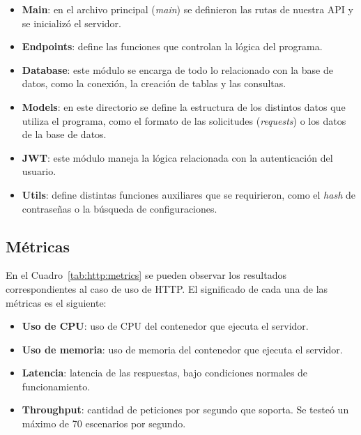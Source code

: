 \documentclass[11pt]{article}
\let\Oldsubsection\subsection
\renewcommand{\subsection}{\FloatBarrier\Oldsubsection}
\newcommand{\english}[1]{\textit{#1}}
\begin{document}
\begin{itemize}
    \item \textbf{Main}: en el archivo principal (\textit{main}) se definieron las rutas de nuestra API y se inicializó el servidor.
    
    \item \textbf{Endpoints}: define las funciones que controlan la lógica del programa.
    
    \item \textbf{Database}: este módulo se encarga de todo lo relacionado con la base de datos, como la conexión, la creación de tablas y las consultas.
    
    \item \textbf{Models}: en este directorio se define la estructura de los distintos datos que utiliza el programa, como el formato de las solicitudes (\english{requests}) o los datos de la base de datos.
    
    \item \textbf{JWT}: este módulo maneja la lógica relacionada con la autenticación del usuario.
    
    \item \textbf{Utils}: define distintas funciones auxiliares que se requirieron, como el \english{hash} de contraseñas o la búsqueda de configuraciones.
\end{itemize}

\subsection{Métricas}

En el Cuadro~\ref{tab:http:metrics} se pueden observar los resultados correspondientes al caso de uso de HTTP. El significado de cada una de las métricas es el siguiente:

\begin{itemize}
    \item \textbf{Uso de CPU}: uso de CPU del contenedor que ejecuta el servidor.
    \item \textbf{Uso de memoria}: uso de memoria del contenedor que ejecuta el servidor.
    \item \textbf{Latencia}: latencia de las respuestas, bajo condiciones normales de funcionamiento.
    \item \textbf{Throughput}: cantidad de peticiones por segundo que soporta. Se testeó un máximo de 70 escenarios por segundo.
\end{itemize}
\end{document}
